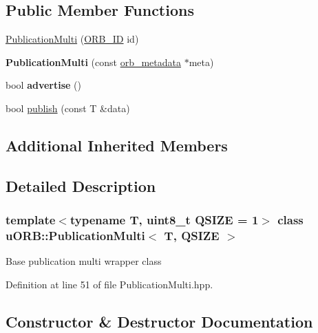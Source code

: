 \subsection*{Public Member Functions}
\begin{DoxyCompactItemize}
\item 
\hyperlink{classuORB_1_1PublicationMulti_a012ffe3988cb69d32bc9a9e2807843a5}{Publication\+Multi} (\hyperlink{uORB_8h_a96af5434ec1acdf24287bd7851b0413f}{O\+R\+B\+\_\+\+ID} id)
\item 
\mbox{\label{classuORB_1_1PublicationMulti_ad035712d9637183bf85ff41f7f00521a}} 
{\bfseries Publication\+Multi} (const \hyperlink{structorb__metadata}{orb\+\_\+metadata} $\ast$meta)
\item 
\mbox{\label{classuORB_1_1PublicationMulti_a663a534a770585e9fe6025d393a80651}} 
bool {\bfseries advertise} ()
\item 
bool \hyperlink{classuORB_1_1PublicationMulti_a98dd47e770678acb5bc7489a90cd9cdd}{publish} (const T \&data)
\end{DoxyCompactItemize}
\subsection*{Additional Inherited Members}


\subsection{Detailed Description}
\subsubsection*{template$<$typename T, uint8\+\_\+t Q\+S\+I\+ZE = 1$>$\newline
class u\+O\+R\+B\+::\+Publication\+Multi$<$ T, Q\+S\+I\+Z\+E $>$}

Base publication multi wrapper class 

Definition at line 51 of file Publication\+Multi.\+hpp.



\subsection{Constructor \& Destructor Documentation}
\mbox{\label{classuORB_1_1PublicationMulti_a012ffe3988cb69d32bc9a9e2807843a5}} 
